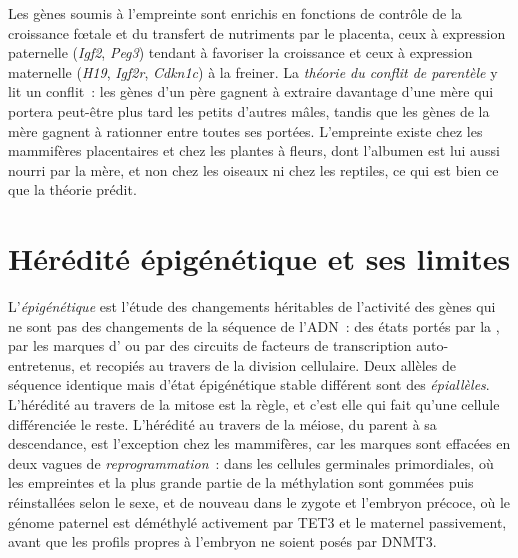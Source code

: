 \begin{remark}\label{rem:b3:chromatin-epigenetics:kinship}
Les gènes soumis à l'empreinte sont enrichis en fonctions de contrôle
de la croissance fœtale et du transfert de nutriments par le placenta,
ceux à expression paternelle (\emph{Igf2}, \emph{Peg3}) tendant à
favoriser la croissance et ceux à expression maternelle (\emph{H19},
\emph{Igf2r}, \emph{Cdkn1c}) à la freiner. La \emph{théorie du conflit
de parentèle} y lit un conflit~: les gènes d'un père gagnent à extraire
davantage d'une mère qui portera peut-être plus tard les petits
d'autres mâles, tandis que les gènes de la mère gagnent à rationner
entre toutes ses portées. L'empreinte existe chez les mammifères
placentaires et chez les plantes à fleurs, dont l'albumen est lui aussi
nourri par la mère, et non chez les oiseaux ni chez les reptiles, ce
qui est bien ce que la théorie prédit.
\end{remark}

\section{Hérédité épigénétique et ses limites}

\begin{definition}[Épigénétique]\label{def:b3:chromatin-epigenetics:epigenetics}
L'\emph{épigénétique} est l'étude des changements héritables de
l'activité des gènes qui ne sont pas des changements de la séquence de
l'ADN~: des états portés par la , par les marques
d' ou par des circuits de facteurs de transcription
auto-entretenus, et recopiés au travers de la division cellulaire. Deux
allèles de séquence identique mais d'état épigénétique stable
différent sont des \emph{épiallèles}. L'hérédité au travers de la
mitose est la règle, et c'est elle qui fait qu'une cellule
différenciée le reste. L'hérédité au travers de la méiose, du parent à
sa descendance, est l'exception chez les mammifères, car les marques
sont effacées en deux vagues de \emph{reprogrammation}~: dans les
cellules germinales primordiales, où les empreintes et la plus grande
partie de la méthylation sont gommées puis réinstallées selon le sexe,
et de nouveau dans le zygote et l'embryon précoce, où le génome
paternel est déméthylé activement par TET3 et le maternel passivement,
avant que les profils propres à l'embryon ne soient posés par DNMT3.
\end{definition}

